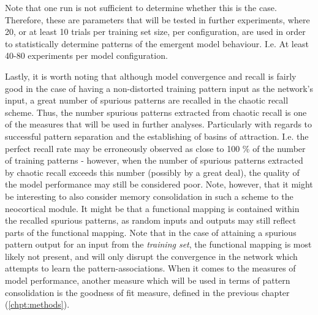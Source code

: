 Note that one run is not sufficient to determine whether this is the case. Therefore, these are parameters that will be tested in further experiments, where 20, or at least 10 trials per training set size, per configuration, are used in order to statistically determine patterns of the emergent model behaviour. I.e. At least 40-80 experiments per model configuration.

Lastly, it is worth noting that although model convergence and recall is fairly good in the case of having a non-distorted training pattern input as the network's input, a great number of spurious patterns are recalled in the chaotic recall scheme. Thus, the number spurious patterns extracted from chaotic recall is one of the measures that will be used in further analyses. Particularly with regards to successful pattern separation and the establishing of basins of attraction. I.e. the perfect recall rate may be erroneously observed as close to 100 \% of the number of training patterns - however, when the number of spurious patterns extracted by chaotic recall exceeds this number (possibly by a great deal), the quality of the model performance may still be considered poor. Note, however, that it might be interesting to also consider memory consolidation in such a scheme to the neocortical module. It might be that a functional mapping is contained within the recalled spurious patterns, as random inputs and outputs may still reflect parts of the functional mapping. 
Note that in the case of attaining a spurious pattern output for an input from the \textit{training set}, the functional mapping is most likely not present, and will only disrupt the convergence in the network which attempts to learn the pattern-associations. 
When it comes to the measures of model performance, another measure which will be used in terms of pattern consolidation is the goodness of fit measure, defined in the previous chapter (\ref{chpt:methods}).


